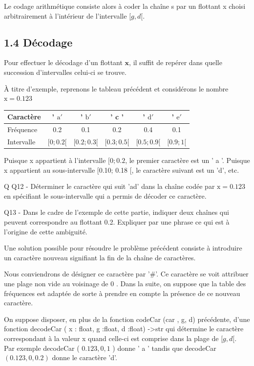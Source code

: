 \documentclass[10pt]{article}
\begin{document}
Le codage arithmétique consiste alors à coder la chaîne s par un flottant x choisi arbitrairement à l'intérieur de l'intervalle $[g, d[$.

\subsection*{1.4 Décodage}
Pour effectuer le décodage d'un flottant $\mathbf{x}$, il suffit de repérer dans quelle succession d'intervalles celui-ci se trouve.

À titre d'exemple, reprenons le tableau précédent et considérons le nombre $\mathrm{x}=0.123$

\begin{center}
\begin{tabular}{|l|c|c|c|c|c|}
\hline
Caractère & ' $\mathrm{a} '$ & ' $\mathrm{b} '$ & ' c ' & ' $\mathrm{d} '$ & ' $\mathrm{e} '$ \\
\hline
Fréquence & 0.2 & 0.1 & 0.2 & 0.4 & 0.1 \\
\hline
Intervalle & $[0 ; 0.2[$ & $[0.2 ; 0.3[$ & $[0.3 ; 0.5[$ & $[0.5 ; 0.9[$ & $[0.9 ; 1[$ \\
\hline
\end{tabular}
\end{center}

Puisque x appartient à l'intervalle $[0 ; 0.2$, le premier caractère est un ' a '. Puisque x appartient au sous-intervalle [0.10; 0.18 [, le caractère suivant est un 'd', etc.

Q Q12 - Déterminer le caractère qui suit 'ad' dans la chaîne codée par $\mathrm{x}=0.123$ en spécifiant le sous-intervalle qui a permis de décoder ce caractère.

Q13 - Dans le cadre de l'exemple de cette partie, indiquer deux chaînes qui peuvent correspondre au flottant 0.2. Expliquer par une phrase ce qui est à l'origine de cette ambiguité.

Une solution possible pour résoudre le problème précédent consiste à introduire un caractère nouveau signifiant la fin de la chaîne de caractères.

Nous conviendrons de désigner ce caractère par '\#'. Ce caractère se voit attribuer une plage non vide au voisinage de 0 . Dans la suite, on suppose que la table des fréquences est adaptée de sorte à prendre en compte la présence de ce nouveau caractère.

On suppose disposer, en plus de la fonction codeCar (car , g, d) précédente, d'une fonction decodeCar ( x : float, g :float, d :float) ->str qui détermine le caractère correspondant à la valeur x quand celle-ci est comprise dans la plage de $[g, d[$.\\
Par exemple decodeCar ( $0.123,0,1$ ) donne ' a ' tandis que decodeCar $(0.123,0,0.2)$ donne le caractère 'd'.
\end{document}
